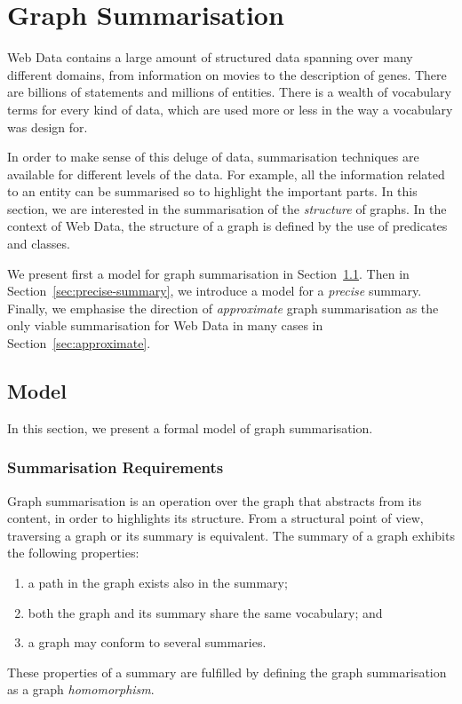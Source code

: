 \section{Graph Summarisation}
\label{chap4:summary:model}

Web Data contains a large amount of structured data spanning over many different domains, from information on movies to the description of genes. There are billions of statements and millions of entities. There is a wealth of vocabulary terms for every kind of data, which are used more or less in the way a vocabulary was design for.

In order to make sense of this deluge of data, summarisation techniques are available for different levels of the data. For example, all the information related to an entity can be summarised so to highlight the important parts. In this section, we are interested in the summarisation of the \emph{structure} of graphs. In the context of Web Data, the structure of a graph is defined by the use of predicates and classes.

We present first a model for graph summarisation in Section~\ref{sec:summary:model}. Then in Section~\ref{sec:precise-summary}, we introduce a model for a \emph{precise} summary. Finally, we emphasise the direction of \emph{approximate} graph summarisation as the only viable summarisation for Web Data in many cases in Section~\ref{sec:approximate}.%

\subsection{Model}
\label{sec:summary:model}

In this section, we present a formal model of graph summarisation.

\subsubsection{Summarisation Requirements}

Graph summarisation is an operation over the graph that abstracts from its content, in order to highlights its structure. From a structural point of view, traversing a graph or its summary is equivalent. The summary of a graph exhibits the following properties:
\begin{enumerate}
	\item a path in the graph exists also in the summary;
	\label{sprop-path}
	\item both the graph and its summary share the same vocabulary; and
	\label{sprop-voc}
	\item a graph may conform to several summaries.
	\label{sprop-not-uniq}
\end{enumerate}
These properties of a summary are fulfilled by defining the graph summarisation as a graph \emph{homomorphism}.

